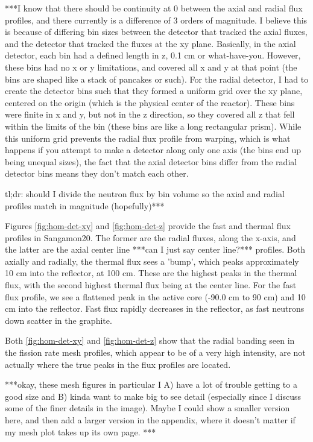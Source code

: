 


***I know that there should be continuity at 0 between the axial and radial flux profiles, and there currently is a difference of 3 orders of magnitude.  I believe this is because of differing bin sizes between the detector that tracked the axial fluxes, and the detector that tracked the fluxes at the xy plane.  Basically, in the axial detector, each bin had a defined length in z, 0.1 cm or what-have-you.  However, these bins had no x or y limitations, and covered all x and y at that point (the bins are shaped like a stack of pancakes or such).  For the radial detector, I had to create the detector bins such that they formed a uniform grid over the xy plane, centered on the origin (which is the physical center of the reactor).  These bins were finite in x and y, but not in the z direction, so they covered all z that fell within the limits of the bin (these bins are like a long rectangular prism).  While this uniform grid prevents the radial flux profile from warping, which is what happens if you attempt to make a detector along only one axis (the bins end up being unequal sizes), the fact that the axial detector bins differ from the radial detector bins means they don't match each other.

tl;dr: should I divide the neutron flux by bin volume so the axial and radial profiles match in magnitude (hopefully)***

Figures \ref{fig:hom-det-xy} and \ref{fig:hom-det-z} provide the fast and thermal flux profiles in Sangamon20.  The former are the radial fluxes, along the x-axis, and the latter are the axial center line ***can I just say center line?*** profiles.  Both axially and radially, the thermal flux sees a 'bump', which peaks approximately 10 cm into the reflector, at 100 cm.  These are the highest peaks in the thermal flux, with the second highest thermal flux being at the center line.  For the fast flux profile, we see a flattened peak in the  active core (-90.0 cm to 90 cm) and 10 cm into the reflector.  Fast flux rapidly decreases in the reflector, as fast neutrons down scatter in the graphite.

Both \ref{fig:hom-det-xy} and \ref{fig:hom-det-z} show that the radial banding seen in the fission rate mesh profiles, which appear to be of a very high intensity, are not actually where the true peaks in the flux profiles are located.




***okay, these mesh figures in particular I A) have a lot of trouble getting to a good size and B) kinda want to make big to see detail (especially since I discuss some of the finer details in the image).  Maybe I could show a smaller version here, and then add a larger version in the appendix, where it doesn't matter if my mesh plot takes up its own page. ***

